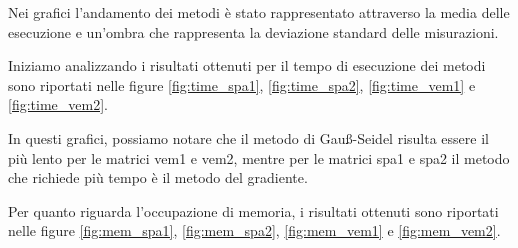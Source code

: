 Nei grafici l'andamento dei metodi è stato rappresentato attraverso la media delle
esecuzione e un'ombra che rappresenta la deviazione standard delle misurazioni.

Iniziamo analizzando i risultati ottenuti per il tempo di esecuzione dei metodi
sono riportati nelle figure \ref{fig:time_spa1}, \ref{fig:time_spa2}, \ref{fig:time_vem1}
e \ref{fig:time_vem2}.

In questi grafici, possiamo notare che il metodo di Gauß-Seidel risulta essere
il più lento per le matrici vem1 e vem2, mentre per le matrici spa1 e spa2
il metodo che richiede più tempo è il metodo del gradiente.

Per quanto riguarda l'occupazione di memoria, i risultati ottenuti sono riportati
nelle figure \ref{fig:mem_spa1}, \ref{fig:mem_spa2}, \ref{fig:mem_vem1} e \ref{fig:mem_vem2}.

